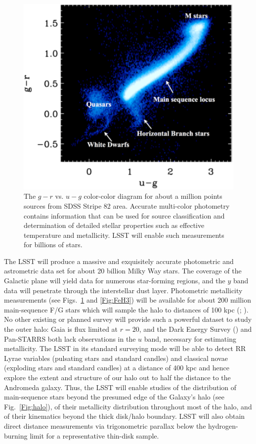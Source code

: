 \begin{figure}
\includegraphics[width=1.0\hsize,clip]{MarlaUGR.pdf}
\caption{The $g-r$ vs. $u-g$ color-color diagram for about a million points sources
from SDSS Stripe 82 area. Accurate multi-color photometry
contains information that can be used for source classification and determination of
detailed stellar properties such as effective temperature and metallicity. LSST will
enable such measurements for billions of stars.}
\label{Fig:FeH}
\end{figure}


The LSST will produce a massive and exquisitely accurate photometric and astrometric data set for about 20 billion
Milky Way stars. The coverage of the Galactic plane will yield data for numerous star-forming
regions, and the $y$ band data will penetrate through the interstellar dust layer. Photometric metallicity
measurements (see Figs.~\ref{Fig:FeH} and \ref{Fig:FeH3}) will be available for about 200 million main-sequence
F/G stars which will sample the halo to distances of 100 kpc (\cite{2008ApJ...684..287I}; \cite{2013ApJ...763...65A}). No other
existing or planned survey will provide such a powerful dataset to
study the outer halo: Gaia
is flux limited at $r=20$, and the Dark Energy Survey (\cite{2011AJ....141..185R}) and Pan-STARRS both
lack observations in the $u$ band, necessary for estimating metallicity. The LSST in its standard surveying mode will
be able to detect RR Lyrae variables (pulsating stars and standard candles) and classical novae (exploding stars
and standard candles) at a distance of 400 kpc and hence explore the extent and structure of our  halo out to
half the distance to the Andromeda galaxy. Thus, the LSST will enable studies of the distribution of main-sequence
stars beyond the presumed edge of the Galaxy's halo (see Fig.~\ref{Fig:halo}), of their metallicity distribution
throughout most of the halo, and of their kinematics beyond the thick disk/halo boundary. LSST will also obtain
direct distance measurements via trigonometric parallax below the hydrogen-burning limit for a representative
thin-disk sample.


